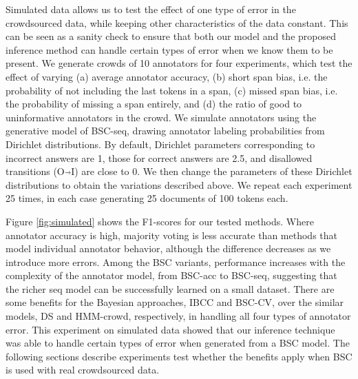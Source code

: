 Simulated data allows us to test the effect of one  
type of error in the crowdsourced data,
while keeping other characteristics of the data constant.
This can be seen as a sanity check to ensure that both our model and 
the proposed inference method can handle certain types of error when we know them
to be present.
We generate crowds of 10 annotators for four experiments, which  
test the effect of varying
(a) average annotator accuracy,
(b) short span bias, i.e. the probability of not including the last tokens in a span, 
(c) missed span bias, i.e. the probability of missing a span entirely,
and (d) the ratio of good to uninformative annotators in the crowd.
We simulate annotators using the generative model of BSC-seq, 
drawing annotator labeling probabilities from Dirichlet distributions. 
By default, Dirichlet parameters corresponding to incorrect answers are 1,
those for correct answers are 2.5, and disallowed transitions (O$\Arrow{0.2cm}$I) are close to 0. 
We then change the parameters of these Dirichlet distributions 
to obtain the variations described above. 
We repeat each experiment 25 times, in each case generating 25 documents of 100 tokens each. 

Figure \ref{fig:simulated} shows the F1-scores for our tested methods. 
Where annotator accuracy is high, majority voting is less accurate than  methods that model individual annotator behavior, although the difference decreases as we introduce more errors.
Among the BSC variants, performance increases with the complexity of the annotator model, from BSC-acc to BSC-seq,
suggesting that the richer seq model can be successfully learned on a small dataset. 
There are some benefits for the Bayesian approaches, IBCC and BSC-CV, over the similar  models, DS and HMM-crowd, respectively, in handling all four types of annotator error.
This experiment on simulated data showed that our inference technique was able to handle certain types of error when generated from a BSC model. The following sections
describe experiments test whether the benefits apply when BSC is used with real crowdsourced data.



